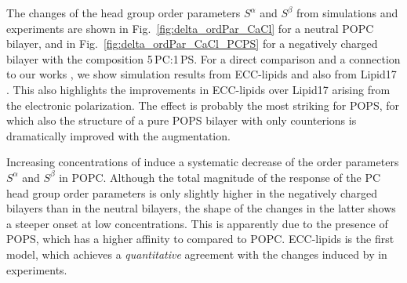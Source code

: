 \documentclass[12pt,a4paper,twoside,openright]{report}
\begin{document}
 




The changes of the head group order parameters $S^\alpha$ and $S^\beta$ from simulations and experiments 
are shown in Fig.~\ref{fig:delta_ordPar_CaCl} for a neutral POPC bilayer, 
and in Fig.~\ref{fig:delta_ordPar_CaCl_PCPS} for a negatively charged bilayer with the composition 5\,PC:1\,PS. 
For a direct comparison and a connection to our works \citep{catte16, nmrlipids_proj4},
we show simulation results from ECC-lipids and also from Lipid17 \citep{lipid17-future}. 
This also highlights the improvements in ECC-lipids over Lipid17 arising from the electronic polarization. 
The effect is probably the most striking for POPS, 
for which also the structure of a pure POPS bilayer with only counterions is dramatically improved with the augmentation. 


Increasing concentrations of  induce a systematic decrease of the order parameters $S^\alpha$ and $S^\beta$ in POPC. 
Although the total magnitude of the response of the PC head group order parameters 
is only slightly higher in the negatively charged bilayers than in the neutral bilayers, 
the shape of the changes in the latter shows a steeper onset at low concentrations. 
This is apparently due to the presence of POPS, 
which has a higher affinity to  compared to POPC. 
ECC-lipids is the first model,
which achieves a \emph{quantitative} agreement with the changes induced by  in experiments. 
\end{document}
